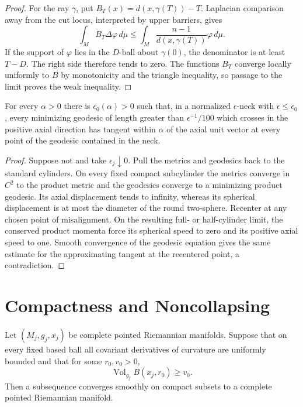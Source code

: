 \begin{proof}
For the ray $\gamma$, put
$B_T(x)=d(x,\gamma(T))-T$.  Laplacian comparison away from the cut locus,
interpreted by upper barriers, gives
\[
 \int_M B_T\Delta\varphi\,d\mu
 \le \int_M\frac{n-1}{d(x,\gamma(T))}\varphi\,d\mu.
\]
If the support of $\varphi$ lies in the $D$-ball about $\gamma(0)$, the
denominator is at least $T-D$.  The right side therefore tends to zero.
The functions $B_T$ converge locally uniformly to $B$ by monotonicity and
the triangle inequality, so passage to the limit proves the weak inequality.
\end{proof}

\begin{lemma}
\label{lem:epsilon-neck-geodesic-axis-alignment}
\notready
For every $\alpha>0$ there is $\epsilon_0(\alpha)>0$ such that, in a
normalized $\epsilon$-neck with $\epsilon\le\epsilon_0$, every minimizing
geodesic of length greater than $\epsilon^{-1}/100$ which crosses in the
positive axial direction has tangent within $\alpha$ of the axial unit
vector at every point of the geodesic contained in the neck.
\end{lemma}

\begin{proof}
Suppose not and take $\epsilon_j\downarrow0$.  Pull the metrics and geodesics
back to the standard cylinders.  On every fixed compact subcylinder the
metrics converge in $C^2$ to the product metric and the geodesics converge
to a minimizing product geodesic.  Its axial displacement tends to infinity,
whereas its spherical displacement is at most the diameter of the round
two-sphere.  Recenter at any chosen point of misalignment.  On the resulting
full- or half-cylinder limit, the conserved product momenta force its
spherical speed to zero and its positive axial speed to one.  Smooth
convergence of the geodesic equation gives the same estimate for the
approximating tangent at the recentered point, a contradiction.
\end{proof}

\section{Compactness and Noncollapsing}

\begin{theorem}
\label{thm:pointed-riemannian-compactness}
\notready
Let $(M_j,g_j,x_j)$ be complete pointed Riemannian manifolds.  Suppose that
on every fixed based ball all covariant derivatives of curvature are
uniformly bounded and that for some $r_0,v_0>0$,
\[
 \operatorname{Vol}_{g_j}B(x_j,r_0)\ge v_0.
\]
Then a subsequence converges smoothly on compact subsets to a complete
pointed Riemannian manifold.
\end{theorem}

